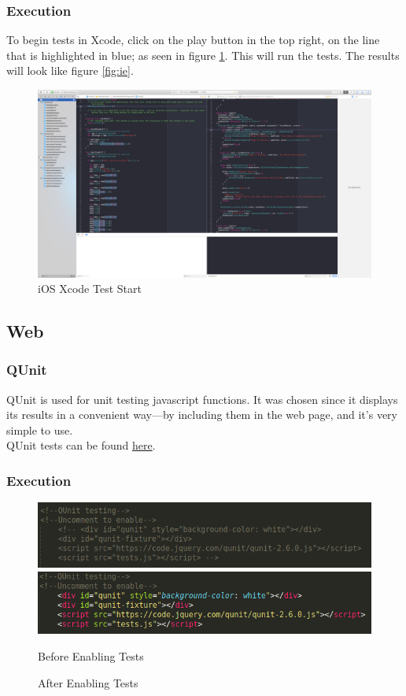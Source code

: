 \documentclass[12pt]{article}
\begin{document}
\subsubsection{Execution}
To begin tests in Xcode, click on the play button in the top right, on the line that is highlighted in blue; as seen in figure \ref{fig:is}. This will run the tests. The results will look like figure \ref{fig:ie}.
  \begin{figure}
  	\includegraphics[width=\textwidth]{images/iOS-test.png}
	\caption{iOS Xcode Test Start}
	\label{fig:is}
  \end{figure}

\subsection{Web}
\subsubsection{QUnit}
QUnit is used for unit testing javascript functions. It was chosen since it displays its results in a convenient way---by including them in the web page, and it's very simple to use.\\
\indent QUnit tests can be found \href{https://github.com/BinaryNinjaz/COS301-Capstone/tree/master/Source/Web/app}{here}.
\subsubsection{Execution}
\begin{figure}[ht!]
            \includegraphics[width=.5\textwidth]{images/q1.png}
            \includegraphics[width=.5\textwidth]{images/q2.png}
            \caption{Before Enabling Tests}
            \label{fig:q1}
            \caption{After Enabling Tests}
            \label{fig:q2}
        \end{figure}
\end{document}
